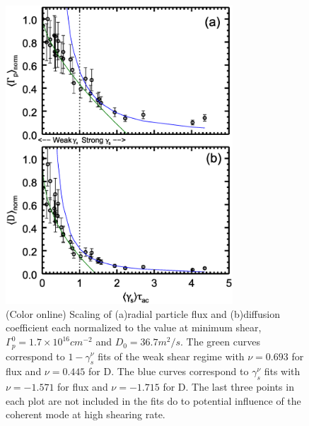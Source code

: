 \documentclass[aip,pop,amsmath,amssymb,preprint,superscriptaddress]{revtex4-1} %
\begin{document}
\begin{figure}[!htbp]
\centerline{
\includegraphics[width=8.5cm]{figure5.eps}}
\caption{\label{fig:fluxandD} (Color online) Scaling of (a)radial particle flux and (b)diffusion coefficient each normalized to the value at minimum shear, $\Gamma_{p}^{0} = 1.7\times10^{16} cm^{-2}$ and $D_{0} = 36.7 m^{2}/s$. The green curves correspond to $1-\gamma_{s}^{\nu}$ fits of the weak shear regime with $\nu = 0.693$ for flux and $\nu = 0.445$ for D. The blue curves correspond to $\gamma_{s}^{\nu}$ fits with $\nu = -1.571$ for flux and $\nu = -1.715$ for D. The last three points in each plot are not included in the fits do to potential influence of the coherent mode at high shearing rate.}
\end{figure}
\end{document}
